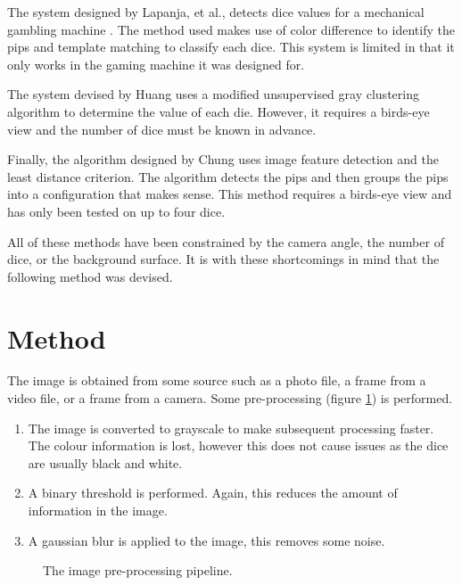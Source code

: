 \documentclass[conference]{IEEEtran}
\begin{document}
The system designed by Lapanja, et al., detects dice values for a mechanical gambling machine \cite{Lapanjaa}.
The method used makes use of color difference to identify the pips and template matching to classify each dice.
This system is limited in that it only works in the gaming machine it was designed for.

The system devised by Huang \cite{Huang2008} uses a modified unsupervised gray clustering algorithm to determine the value of each die.
However, it requires a birds-eye view and the number of dice must be known in advance.

Finally, the algorithm designed by Chung \cite{Chung2009} uses image feature detection and the least distance criterion.
The algorithm detects the pips and then groups the pips into a configuration that makes sense.
This method requires a birds-eye view and has only been tested on up to four dice.

All of these methods have been constrained by the camera angle, the number of dice, or the background surface.
It is with these shortcomings in mind that the following method was devised.

\section{Method}

The image is obtained from some source such as a photo file, a frame from a video file, or a frame from a camera.
Some pre-processing (figure \ref{fig:pre-processing}) is performed.
\begin{enumerate}
	\item The image is converted to grayscale to make subsequent processing faster. The colour information is lost, however this does not cause issues as the dice are usually black and white.
	\item A binary threshold is performed. Again, this reduces the amount of information in the image.
	\item A gaussian blur is applied to the image, this removes some noise.
\end{enumerate}
\begin{figure}
	\centering
	\caption{The image pre-processing pipeline.}
	\label{fig:pre-processing}
\end{figure}
\end{document}

